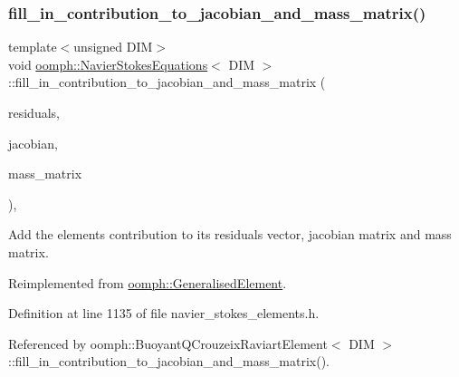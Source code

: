 \mbox{\label{classoomph_1_1NavierStokesEquations_a550fe44fb346cf92e8e7e4588ee0b97d}} 
\subsubsection{\texorpdfstring{fill\+\_\+in\+\_\+contribution\+\_\+to\+\_\+jacobian\+\_\+and\+\_\+mass\+\_\+matrix()}{fill\_in\_contribution\_to\_jacobian\_and\_mass\_matrix()}}
{\footnotesize\ttfamily template$<$unsigned D\+IM$>$ \\
void \hyperlink{classoomph_1_1NavierStokesEquations}{oomph\+::\+Navier\+Stokes\+Equations}$<$ D\+IM $>$\+::fill\+\_\+in\+\_\+contribution\+\_\+to\+\_\+jacobian\+\_\+and\+\_\+mass\+\_\+matrix (\begin{DoxyParamCaption}\item[{\hyperlink{classoomph_1_1Vector}{Vector}$<$ double $>$ \&}]{residuals,  }\item[{\hyperlink{classoomph_1_1DenseMatrix}{Dense\+Matrix}$<$ double $>$ \&}]{jacobian,  }\item[{\hyperlink{classoomph_1_1DenseMatrix}{Dense\+Matrix}$<$ double $>$ \&}]{mass\+\_\+matrix }\end{DoxyParamCaption})\hspace{0.3cm}{\ttfamily [inline]}, {\ttfamily [virtual]}}



Add the element\textquotesingle{}s contribution to its residuals vector, jacobian matrix and mass matrix. 



Reimplemented from \hyperlink{classoomph_1_1GeneralisedElement_a2b6294a730647cf865da94f2531466f8}{oomph\+::\+Generalised\+Element}.



Definition at line 1135 of file navier\+\_\+stokes\+\_\+elements.\+h.



Referenced by oomph\+::\+Buoyant\+Q\+Crouzeix\+Raviart\+Element$<$ D\+I\+M $>$\+::fill\+\_\+in\+\_\+contribution\+\_\+to\+\_\+jacobian\+\_\+and\+\_\+mass\+\_\+matrix().

